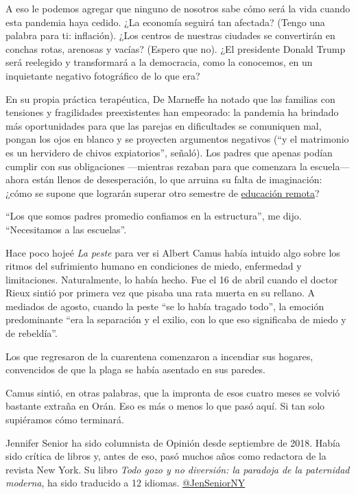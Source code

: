 A eso le podemos agregar que ninguno de nosotros sabe cómo será la vida
cuando esta pandemia haya cedido. ¿La economía seguirá tan afectada?
(Tengo una palabra para ti: inflación). ¿Los centros de nuestras
ciudades se convertirán en conchas rotas, arenosas y vacías? (Espero que
no). ¿El presidente Donald Trump será reelegido y transformará a la
democracia, como la conocemos, en un inquietante negativo fotográfico de
lo que era?

En su propia práctica terapéutica, De Marneffe ha notado que las
familias con tensiones y fragilidades preexistentes han empeorado: la
pandemia ha brindado más oportunidades para que las parejas en
dificultades se comuniquen mal, pongan los ojos en blanco y se proyecten
argumentos negativos (``y el matrimonio es un hervidero de chivos
expiatorios'', señaló). Los padres que apenas podían cumplir con sus
obligaciones ---mientras rezaban para que comenzara la escuela--- ahora
están llenos de desesperación, lo que arruina su falta de imaginación:
¿cómo se supone que lograrán superar otro semestre de
\href{https://www.nytimes.com/es/2020/05/01/espanol/escuela-casa-coronavirus.html}{educación
remota}?

``Los que somos padres promedio confiamos en la estructura'', me dijo.
``Necesitamos a las escuelas''.

Hace poco hojeé \emph{La peste} para ver si Albert Camus había intuido
algo sobre los ritmos del sufrimiento humano en condiciones de miedo,
enfermedad y limitaciones. Naturalmente, lo había hecho. Fue el 16 de
abril cuando el doctor Rieux sintió por primera vez que pisaba una rata
muerta en su rellano. A mediados de agosto, cuando la peste ``se lo
había tragado todo'', la emoción predominante ``era la separación y el
exilio, con lo que eso significaba de miedo y de rebeldía''.

Los que regresaron de la cuarentena comenzaron a incendiar sus hogares,
convencidos de que la plaga se había asentado en sus paredes.

Camus sintió, en otras palabras, que la impronta de esos cuatro meses se
volvió bastante extraña en Orán. Eso es más o menos lo que pasó aquí. Si
tan solo supiéramos cómo terminará.

Jennifer Senior ha sido columnista de Opinión desde septiembre de 2018.
Había sido crítica de libros y, antes de eso, pasó muchos años como
redactora de la revista New York. Su libro \emph{Todo gozo y no
diversión: la paradoja de la paternidad moderna}, ha sido traducido a 12
idiomas. \href{https://twitter.com/jenseniorny}{@JenSeniorNY}

